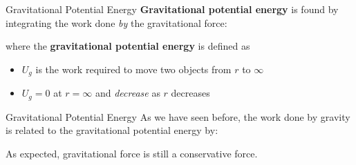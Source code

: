 \documentclass[12pt,compress,aspectratio=169]{beamer}
\begin{document}
\begin{frame}{Gravitational Potential Energy}
  \textbf{Gravitational potential energy} is found by integrating the work
  done \emph{by} the gravitational force:


  where the \textbf{gravitational potential energy} is defined as
  
  \begin{itemize}
  \item $U_g$ is the work required to move two objects from $r$ to $\infty$
  \item $U_g=0$ at $r=\infty$ and \emph{decrease} as $r$ decreases
  \end{itemize}
\end{frame}



\begin{frame}{Gravitational Potential Energy}
  As we have seen before, the work done by gravity is related to the
  gravitational potential energy by:
  


  As expected, gravitational force is still a conservative force.
\end{frame}
\end{document}
